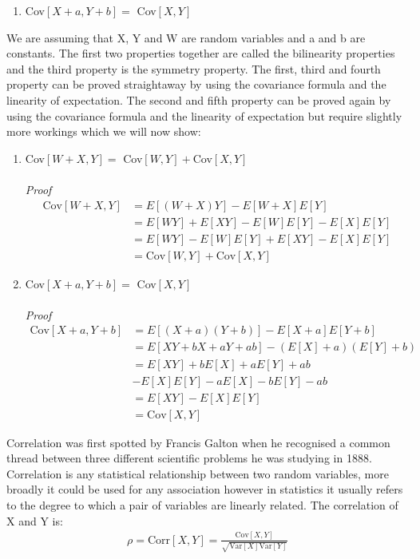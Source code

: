 \documentclass[,oneside]{article}
\begin{document}
\begin{enumerate}
\begin{enumerate}
\item Cov$[X+a,Y +b]=$ Cov$[X,Y]$
\end{enumerate}  
We are assuming that X, Y and W are random variables and a and b are constants. The first two properties together are called the bilinearity properties and the third property is the symmetry property. The first, third and fourth property can be proved straightaway by using the covariance formula and the linearity of expectation. The second and fifth property can be proved again by using the covariance formula and the linearity of expectation but require slightly more workings which we will now show:\\
\begin{enumerate}
\item Cov$[W+X,Y]=$ Cov$[W,Y]+$Cov$[X,Y]$\\ \\
\textit{Proof}
\begin{align*}
\text{Cov}[W+X,Y]&=E[(W +X)Y]-E[W +X]E[Y]\\
&=E[WY]+E[XY]-E[W]E[Y]-E[X]E[Y]\\
&=E[WY]-E[W]E[Y]+E[XY]-E[X]E[Y]\\
&=\text{Cov}[W,Y]+\text{Cov}[X,Y]
\end{align*}
\item Cov$[X+a,Y+b]=$ Cov$[X,Y]$\\ \\
\textit{Proof}
\begin{align*}
\text{Cov}[X+a,Y+b]&=E[(X +a)(Y+b)]-E[X+a]E[Y+b]\\
&=E[XY+bX+aY+ab]-(E[X]+a)(E[Y]+b)\\
&=E[XY]+bE[X]+aE[Y]+ab\\
&-E[X]E[Y]-aE[X]-bE[Y]-ab\\
&=E[XY]-E[X]E[Y]\\
&=\text{Cov}[X,Y]
\end{align*}
\end{enumerate}  
Correlation was first spotted by Francis Galton when he recognised a common thread between three different scientific problems he was studying in 1888. Correlation is any statistical relationship between two random variables, more broadly it could be used for any association however in statistics it usually refers to the degree to which a pair of variables are linearly related. The correlation of X and Y is:
\begin{align*}
\rho = \text{Corr}[X,Y] = \frac{\text{Cov}[X,Y]}{\sqrt{\text{Var}[X]\text{Var}[Y]}}
\end{align*}

\end{enumerate}
\end{document}
